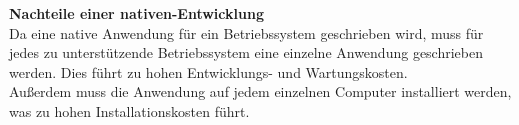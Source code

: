 \documentclass[ngerman]{article}
\begin{document}
    \textbf{Nachteile einer nativen-Entwicklung}\\
    Da eine native Anwendung für ein Betriebssystem geschrieben wird, muss für jedes zu unterstützende Betriebssystem eine einzelne Anwendung geschrieben werden. Dies führt zu hohen Entwicklungs- und Wartungskosten. \cite{Native app vs Web app: Multi-criteria decision-making for optimised mobile solution}\\
    Außerdem muss die Anwendung auf jedem einzelnen Computer installiert werden, was zu hohen Installationskosten führt.
\end{document}

